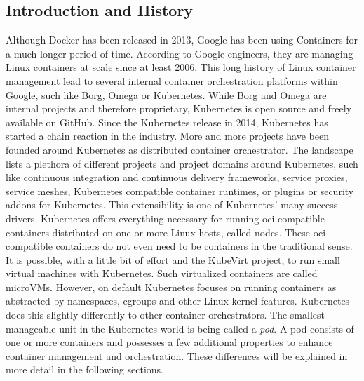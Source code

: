 \documentclass[titlepage]{report}
\begin{document}
\subsection{Introduction and History}
Although Docker has been released in 2013, Google has been using Containers for a much longer period of time. According to Google engineers, they are managing Linux containers at scale since
at least 2006\cite{burns2016borg}. This long history of Linux container management lead to several internal container orchestration platforms within Google, such like Borg\cite{verma2015large}, Omega\cite{schwarzkopf2013omega} or Kubernetes\cite{kubernetesWebsite}.
While Borg and Omega are internal projects and therefore proprietary, Kubernetes is open source and freely available on GitHub\cite{KubernetesGithub}. Since the Kubernetes release in 2014\cite{KubernetesFirstRelease}, Kubernetes has started a chain reaction
in the industry. More and more projects have been founded around Kubernetes as distributed container orchestrator. The  landscape lists a plethora of different projects and project domains around Kubernetes, such like continuous integration and continuous delivery frameworks,
service proxies, service meshes, Kubernetes compatible container runtimes,  or  plugins or security addons for Kubernetes. This extensibility is one of Kubernetes' many success drivers. Kubernetes offers everything necessary for running
\gls{oci} compatible containers distributed on one or more Linux hosts, called nodes. These \gls{oci} compatible containers do not even need to be containers in the traditional sense. It is possible, with a little bit of effort and the KubeVirt project\cite{KubeVirt},
to run small virtual machines with Kubernetes. Such virtualized containers are called microVMs. However, on default Kubernetes focuses on running containers as abstracted by namespaces, cgroups and other Linux kernel features. Kubernetes does this
slightly differently to other container orchestrators. The smallest manageable unit in the Kubernetes world is being called a \emph{pod}. A pod consists of one or more containers and possesses a few additional properties to enhance container management and orchestration.
These differences will be explained in more detail in the following sections.
\end{document}
